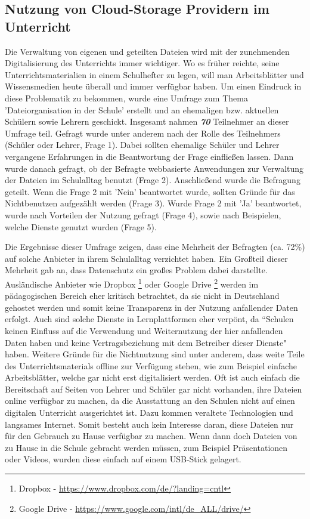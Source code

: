 \subsection{Nutzung von Cloud-Storage Providern im Unterricht}
\label{sec:survey}

Die Verwaltung von eigenen und geteilten Dateien wird mit der zunehmenden Digitalisierung des Unterrichts immer wichtiger. Wo es früher reichte, seine Unterrichtsmaterialien in einem Schulhefter zu legen, will man Arbeitsblätter und Wissensmedien heute überall und immer verfügbar haben. Um einen Eindruck in diese Problematik zu bekommen, wurde eine Umfrage zum Thema 'Dateiorganisation in der Schule' \cite{survey:umfragedateiorganisation} erstellt und an ehemaligen bzw. aktuellen Schülern sowie Lehrern geschickt. Insgesamt nahmen \textbf{\textit{70}} Teilnehmer  an dieser Umfrage teil. Gefragt wurde unter anderem nach der Rolle des Teilnehmers (Schüler oder Lehrer, Frage 1). Dabei sollten ehemalige Schüler und Lehrer vergangene Erfahrungen in die Beantwortung der Frage einfließen lassen. Dann wurde danach gefragt, ob der Befragte webbasierte Anwendungen zur Verwaltung der Dateien im Schulalltag benutzt (Frage 2). Anschließend wurde die Befragung geteilt. Wenn die Frage 2 mit 'Nein' beantwortet wurde, sollten Gründe für das Nichtbenutzen aufgezählt werden (Frage 3). Wurde Frage 2 mit 'Ja' beantwortet, wurde nach Vorteilen der Nutzung gefragt (Frage 4), sowie nach Beispielen, welche Dienste genutzt wurden (Frage 5). 

Die Ergebnisse \cite{survey:umfragedateiorganisationergebnisse} dieser Umfrage zeigen, dass eine Mehrheit der Befragten (ca. 72\%) auf solche Anbieter in ihrem Schulalltag verzichtet haben. Ein Großteil dieser Mehrheit gab an, dass Datenschutz ein großes Problem dabei darstellte. Ausländische Anbieter wie Dropbox \footnote{Dropbox - \url{https://www.dropbox.com/de/?landing=cntl}} oder Google Drive \footnote{Google Drive - \url{https://www.google.com/intl/de_ALL/drive/}} werden im pädagogischen Bereich eher kritisch betrachtet, da sie nicht in Deutschland gehostet werden und somit keine Transparenz in der Nutzung anfallender Daten erfolgt. Auch sind solche Dienste in Lernplattformen eher verpönt, da ``Schulen keinen Einfluss auf die Verwendung und Weiternutzung der hier anfallenden Daten haben und keine Vertragsbeziehung mit dem Betreiber dieser Dienste" \cite{online:itslearningmythenundfakten} haben. Weitere Gründe für die Nichtnutzung sind unter anderem, dass weite Teile des Unterrichtsmaterials offline zur Verfügung stehen, wie zum Beispiel einfache Arbeitsblätter, welche gar nicht erst digitalisiert werden. Oft ist auch einfach die Bereitschaft auf Seiten von Lehrer und Schüler gar nicht vorhanden, ihre Dateien online verfügbar zu machen, da die Ausstattung an den Schulen nicht auf einen digitalen Unterricht ausgerichtet ist. Dazu kommen veraltete Technologien und langsames Internet. Somit besteht auch kein Interesse daran, diese Dateien nur für den Gebrauch zu Hause verfügbar zu machen. Wenn dann doch Dateien von zu Hause in die Schule gebracht werden müssen, zum Beispiel Präsentationen oder Videos, wurden diese einfach auf einem USB-Stick gelagert.

